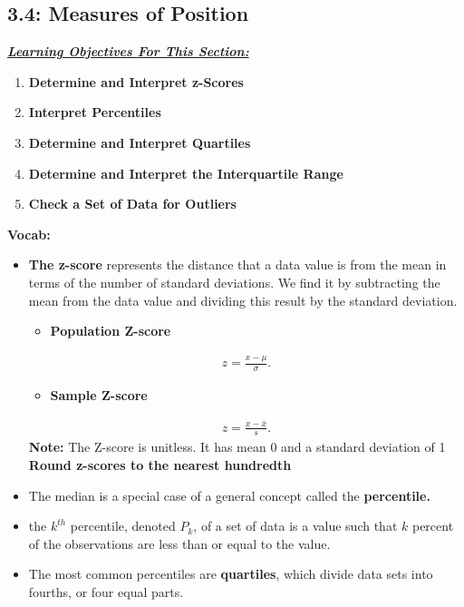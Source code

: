 \documentclass{report}
\begin{document}
         \pagebreak \bigbreak \noindent
         \subsection{3.4: Measures of Position }
         \bigbreak \noindent 
         \textbf{\textit{\underline{Learning Objectives For This Section:}}}
         \begin{enumerate}
             \item \textbf{Determine and Interpret z-Scores}
             \item \textbf{Interpret Percentiles}
             \item \textbf{Determine and Interpret Quartiles}
             \item \textbf{Determine and Interpret the Interquartile Range}
             \item \textbf{Check a Set of Data for Outliers}
         \end{enumerate}
         \bigbreak \noindent 
         \textbf{Vocab:}
         \begin{itemize}
             \item \textbf{The z-score} represents the distance that a data value is from the mean in terms of the number of standard deviations. We find it by subtracting the mean from the data value and dividing this result by the standard deviation.
                 \begin{itemize}
                     \item \textbf{Population Z-score}
                 \end{itemize}
                 \begin{align*}
                      z = \frac{x - \mu}{\sigma}
                 .\end{align*}
                 \begin{itemize}
                     \item \textbf{Sample Z-score}
                 \end{itemize}
                 \begin{align*}
                     z =\frac{x-\overline{x}}{s}
                 .\end{align*}
                 \textbf{Note:} The Z-score is unitless. It has mean  0 and a standard deviation of 1 \\
                 \textbf{Round z-scores to the nearest hundredth}
             \item  The median is a special case of a general concept called the \textbf{percentile.}
                \item the $k^{th}$  percentile, denoted $P_{k} $,  of a set of data is a value such that $k $  percent of the observations are less than or equal to the value.
                \item The most common percentiles are \textbf{quartiles}, which divide data sets into fourths, or four equal parts.

         \end{itemize}
\end{document}
